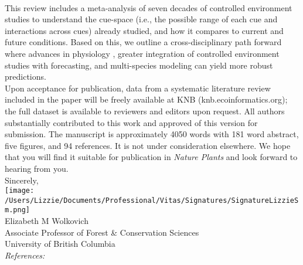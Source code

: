 \documentclass[11pt,a4paper]{article}
\begin{document}
\vspace{1.5ex}\\
This review includes a meta-analysis of seven decades of controlled environment studies to understand the cue-space (i.e., the possible range of each cue and interactions across cues) already studied, and how it compares to current and future conditions. Based on this, we outline a cross-disciplinary path forward where advances in physiology \citep[e.g.,][]{singh2019,chang2021}, greater integration of controlled environment studies with forecasting, and multi-species modeling can yield more robust predictions.
\vspace{1.5ex}\\
Upon acceptance for publication, data from a systematic literature review included in the paper will be freely available at KNB (knb.ecoinformatics.org); the full dataset is available to reviewers and editors upon request. %
All authors substantially contributed to this work and approved of this version for submission. The manuscript is approximately 4050 words with 181 word abstract, five figures, and 94 references. It is not under consideration elsewhere. We hope that you will find it suitable for publication in \emph{Nature Plants} and look forward to hearing from you.
\vspace{1.5ex}\\
Sincerely,\\

\texttt{[image: /Users/Lizzie/Documents/Professional/Vitas/Signatures/SignatureLizzieSm.png]} \\

Elizabeth M Wolkovich\\
Associate Professor of Forest \& Conservation Sciences\\ 
University of British Columbia\\

\emph{References:}
\vspace{-5ex}

\end{document}
